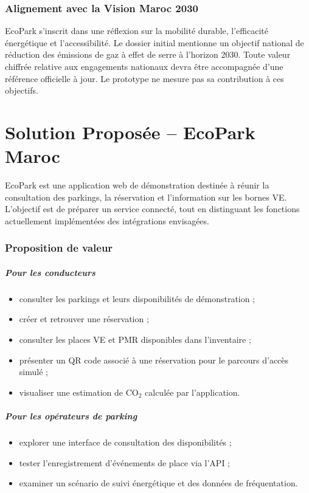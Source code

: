 \documentclass[12pt,a4paper]{report}
\begin{document}
\subsection{Alignement avec la Vision Maroc 2030}

EcoPark s'inscrit dans une réflexion sur la mobilité durable, l'efficacité énergétique et l'accessibilité. Le dossier initial mentionne un objectif national de réduction des émissions de gaz à effet de serre à l'horizon 2030. Toute valeur chiffrée relative aux engagements nationaux devra être accompagnée d'une référence officielle à jour. Le prototype ne mesure pas sa contribution à ces objectifs.

\chapter{Solution Proposée -- EcoPark Maroc}

EcoPark est une application web de démonstration destinée à réunir la consultation des parkings, la réservation et l'information sur les bornes VE. L'objectif est de préparer un service connecté, tout en distinguant les fonctions actuellement implémentées des intégrations envisagées.

\subsection{Proposition de valeur}

\paragraph{Pour les conducteurs}
\begin{itemize}
  \item consulter les parkings et leurs disponibilités de démonstration ;
  \item créer et retrouver une réservation ;
  \item consulter les places VE et PMR disponibles dans l'inventaire ;
  \item présenter un QR code associé à une réservation pour le parcours d'accès simulé ;
  \item visualiser une estimation de CO$_2$ calculée par l'application.
\end{itemize}

\paragraph{Pour les opérateurs de parking}
\begin{itemize}
  \item explorer une interface de consultation des disponibilités ;
  \item tester l'enregistrement d'événements de place via l'API ;
  \item examiner un scénario de suivi énergétique et des données de fréquentation.
\end{itemize}
\end{document}
